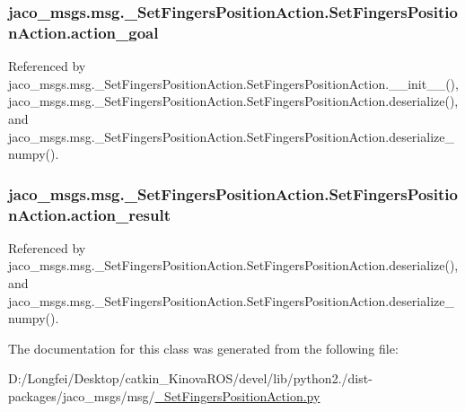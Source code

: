 \subsubsection[{\texorpdfstring{action\+\_\+goal}{action_goal}}]{\setlength{\rightskip}{0pt plus 5cm}jaco\+\_\+msgs.\+msg.\+\_\+\+Set\+Fingers\+Position\+Action.\+Set\+Fingers\+Position\+Action.\+action\+\_\+goal}\hypertarget{classjaco__msgs_1_1msg_1_1__SetFingersPositionAction_1_1SetFingersPositionAction_a0cf79d9f8f0d91ffd627f18a56a1ad37}{}\label{classjaco__msgs_1_1msg_1_1__SetFingersPositionAction_1_1SetFingersPositionAction_a0cf79d9f8f0d91ffd627f18a56a1ad37}


Referenced by jaco\+\_\+msgs.\+msg.\+\_\+\+Set\+Fingers\+Position\+Action.\+Set\+Fingers\+Position\+Action.\+\_\+\+\_\+init\+\_\+\+\_\+(), jaco\+\_\+msgs.\+msg.\+\_\+\+Set\+Fingers\+Position\+Action.\+Set\+Fingers\+Position\+Action.\+deserialize(), and jaco\+\_\+msgs.\+msg.\+\_\+\+Set\+Fingers\+Position\+Action.\+Set\+Fingers\+Position\+Action.\+deserialize\+\_\+numpy().

\subsubsection[{\texorpdfstring{action\+\_\+result}{action_result}}]{\setlength{\rightskip}{0pt plus 5cm}jaco\+\_\+msgs.\+msg.\+\_\+\+Set\+Fingers\+Position\+Action.\+Set\+Fingers\+Position\+Action.\+action\+\_\+result}\hypertarget{classjaco__msgs_1_1msg_1_1__SetFingersPositionAction_1_1SetFingersPositionAction_a9c7765c3d8629a4ddcf9f708a7f27618}{}\label{classjaco__msgs_1_1msg_1_1__SetFingersPositionAction_1_1SetFingersPositionAction_a9c7765c3d8629a4ddcf9f708a7f27618}


Referenced by jaco\+\_\+msgs.\+msg.\+\_\+\+Set\+Fingers\+Position\+Action.\+Set\+Fingers\+Position\+Action.\+deserialize(), and jaco\+\_\+msgs.\+msg.\+\_\+\+Set\+Fingers\+Position\+Action.\+Set\+Fingers\+Position\+Action.\+deserialize\+\_\+numpy().



The documentation for this class was generated from the following file\+:\begin{DoxyCompactItemize}
\item 
D\+:/\+Longfei/\+Desktop/catkin\+\_\+\+Kinova\+R\+O\+S/devel/lib/python2./dist-\/packages/jaco\+\_\+msgs/msg/\hyperlink{__SetFingersPositionAction_8py}{\+\_\+\+Set\+Fingers\+Position\+Action.\+py}\end{DoxyCompactItemize}
